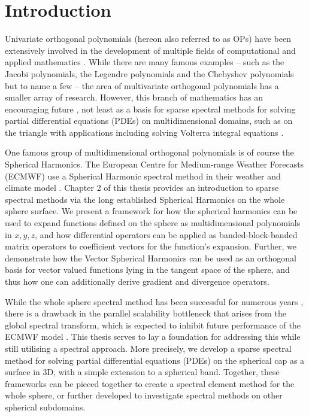
\chapter{Introduction}

Univariate orthogonal polynomials (hereon also referred to as OPs) have been extensively involved in the development of multiple fields of computational and applied mathematics \cite{onedimopsrefs} . While there are many famous examples -- such as the Jacobi polynomials, the Legendre polynomials and the Chebyshev polynomials but to name a few -- the area of multivariate orthogonal polynomials has a smaller array of research. However, this branch of mathematics has an encouraging future \cite{dunkl2014orthogonal}, not least as a basis for sparse spectral methods for solving partial differential equations (PDEs) on multidimensional domains, such as on the triangle \cite{olver2019triangle} with applications including solving Volterra integral equations \cite{gutleb2020sparse}.

One famous group of multidimensional orthogonal polynomials is of course the Spherical Harmonics. The European Centre for Medium-range Weather Forecasts (ECMWF) use a Spherical Harmonic spectral method in their weather and climate model \cite{cheong2006dynamical}. Chapter 2 of this thesis provides an introduction to sparse spectral methods via the long established Spherical Harmonics on the whole sphere surface. We present a framework for how the spherical harmonics can be used to expand functions defined on the sphere as multidimensional polynomials in $x, y, z$, and how differential operators can be applied as banded-block-banded matrix operators to coefficient vectors for the function's expansion. Further, we demonstrate how the Vector Spherical Harmonics can be used as an orthogonal basis for vector valued functions lying in the tangent space of the sphere, and thus how one can additionally derive gradient and divergence operators.

While the whole sphere spectral method has been successful for numerous years \cite{wedi2013fast}, there is a drawback in the parallel scalability bottleneck that arises from the global spectral transform, which is expected to inhibit future performance of the ECMWF model \cite{ecmwf2020scalability}. This thesis serves to lay a foundation for addressing this while still utilising a spectral approach. More precisely, we develop a sparse spectral method for solving partial differential equations (PDEs) on the spherical cap as a surface in 3D, with a simple extension to a spherical band. Together, these frameworks can be pieced together to create a spectral element method for the whole sphere, or further developed to investigate spectral methods on other spherical subdomains.

